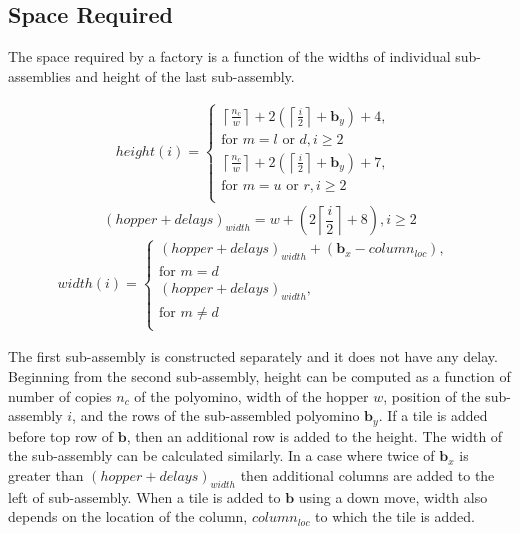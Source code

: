 \subsection{Space Required}\label{sec:requiredSpace}
The space required by a factory is a function of the widths of individual sub-assemblies and height of the last sub-assembly.

\begin{align}
height(i)=
\begin{cases}
\left \lceil{   \frac{n_c}{w}}\right \rceil+2\left(\left \lceil{\frac{i}{2}}\right \rceil+\mathbf{b}_y\right)+4,&\\ 
\text{for } m = l \text{ or } d, i \geq 2&\\
\left \lceil{   \frac{n_c}{w}}\right \rceil+2(\left \lceil{\frac{i}{2}}\right \rceil+\mathbf{b}_y)+7,&\\ 
\text{for } m = u \text{ or } r, i \geq 2&\\
\end{cases}
\end{align}
\begin{equation}
(hopper+delays)_{width}=w+(2\left \lceil{ \frac{i}{2}}\right \rceil+8),  i \geq 2
\end{equation}
\begin{align}
width(i)=
\begin{cases}
(hopper+delays)_{width}+(\mathbf{b}_x-column_{loc}),&\\ 
\text{for } m = d &\\
(hopper+delays)_{width},&\\ 
\text{for } m \neq d &\\
\end{cases}
\end{align}

The first sub-assembly is constructed separately and it does not have any delay.
Beginning from the second sub-assembly, height can be computed as a function of number of copies $n_c$ of the polyomino, width of the hopper $w$, position of the sub-assembly $i$, and the rows of the sub-assembled polyomino $\mathbf{b}_y$. If a tile is added before top row of $\mathbf{b}$, then an additional row is added to the height.
The width of the sub-assembly can be calculated similarly. 
In a case where twice of $\mathbf{b}_x$ is greater than $(hopper+delays)_{width}$ then additional columns are added to the left of sub-assembly. 
When a tile is added to $\mathbf{b}$ using a down move, width also depends on the location of the column, $column_{loc}$ to which the tile is added.  
  

